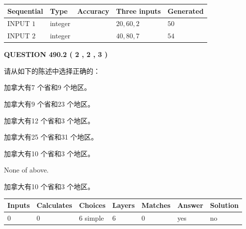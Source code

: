 \documentclass{ctexart}
\begin{document}
   
  
  
\noindent\begin{tabular}{|l|l|l|l|l|}
\hline
 Sequential & Type & Accuracy & Three inputs & Generated \\ 
\hline
 
 
  INPUT $  1 $ & integer &  & $
 20
 , 
 60
 , 
 2
 $ & $ 50 $ 
 \\  \hline  
 
 
  INPUT $  2 $ & integer &  & $
 40
 , 
 80
 , 
 7
 $ & $ 54 $ 
 \\  \hline  
 \end{tabular}
   
   
  
\vspace{0.2in}
  
{\textbf{\Large{QUESTION
490.2 
 ( 2 , 2 , 3 )
}}}
  
  
请从如下的陈述中选择正确的：
 
 
加拿大有7 个省和9 个地区。
 
 
加拿大有9 个省和23 个地区。
 
 
加拿大有12 个省和3 个地区。
 
 
加拿大有25 个省和31 个地区。
 
 
加拿大有10 个省和3 个地区。
 
 
 None of above.
 
 
\noindent{}
 
 
加拿大有10 个省和3 个地区。
 
 
\noindent{}
 
 
   
   
   
   
\noindent\begin{tabular}{|l|l|l|l|l|l|l|}
 \hline
Inputs & Calculates & Choices & Layers & Matches & Answer & Solution \\ \hline
 0  & 
 0  & 
 6
  simple  
  & 
 6  & 
 0  & 
  yes & 
  no 
  \\ \hline
 \end{tabular}
   
   
   
   
\noindent{}
   
\end{document}
